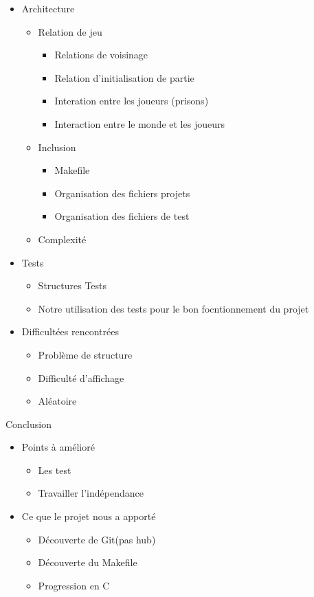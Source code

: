 \documentclass[10pt,a4paper,oneside]{report}
\begin{document}
\begin{itemize}
    
    \item Architecture 
    \begin{itemize}
        \item Relation de jeu 
        \begin{itemize}
            \item Relations de voisinage 
            \item Relation d'initialisation de partie 
            \item Interation entre les joueurs (prisons)
            \item Interaction entre le monde et les joueurs 
        \end{itemize}
        \item Inclusion
        \begin{itemize}
            \item Makefile
            \item Organisation des fichiers projets
            \item Organisation des fichiers de test
        \end{itemize}
        \item Complexité 
    \end{itemize}
    \item Tests 
    \begin{itemize}
        \item Structures Tests
        \item Notre utilisation des tests pour le bon focntionnement du projet 
    \end{itemize}
    \item Difficultées rencontrées 
    \begin{itemize}
        \item Problème de structure
        \item Difficulté d'affichage  
        \item Aléatoire 
    \end{itemize}
    \end{itemize}

Conclusion
\begin{itemize}
    \item Points à amélioré
    \begin{itemize}
        \item Les test
        \item Travailler l'indépendance 
        
    \end{itemize}
    \item Ce que le projet nous a apporté 
    \begin{itemize}
        \item Découverte de Git(pas hub)
        \item Découverte du Makefile
        \item Progression en C
        
    \end{itemize}
\end{itemize}
\end{document}
